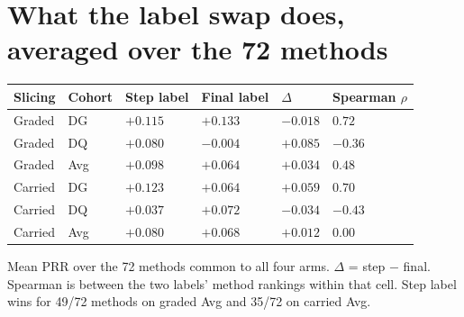 \documentclass[10pt,a4paper]{article}
\begin{document}
\Needspace{40mm}
\section*{What the label swap does, averaged over the 72 methods}
\begingroup
\small
\begin{longtable}{@{}L{34.000mm}C{18.000mm}C{22.000mm}C{22.000mm}C{18.000mm}C{24.000mm}@{}}
\toprule
\textbf{Slicing} & \textbf{Cohort} & \textbf{Step label} & \textbf{Final label} & \textbf{\ensuremath{\Delta}} & \textbf{Spearman \ensuremath{\rho}} \\
\midrule
\endfirsthead
\bottomrule
\endlastfoot
Graded  & DG  & $+0.115$ & $+0.133$ & $-0.018$ & $0.72$ \\
Graded  & DQ  & $+0.080$ & $-0.004$ & $+0.085$ & $-0.36$ \\
Graded  & Avg & $+0.098$ & $+0.064$ & $+0.034$ & $0.48$ \\
Carried & DG  & $+0.123$ & $+0.064$ & $+0.059$ & $0.70$ \\
Carried & DQ  & $+0.037$ & $+0.072$ & $-0.034$ & $-0.43$ \\
Carried & Avg & $+0.080$ & $+0.068$ & $+0.012$ & $0.00$ \\
\end{longtable}
\endgroup
{\small Mean PRR over the 72 methods common to all four arms. $\Delta$ = step $-$ final. Spearman is between the two labels' method rankings within that cell. Step label wins for 49/72 methods on graded Avg and 35/72 on carried Avg.\par}

\Needspace{40mm}
\end{document}
